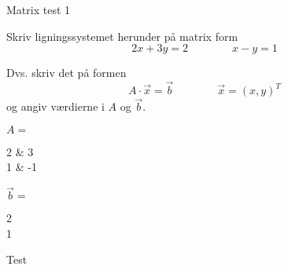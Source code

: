 \documentclass{article}
\begin{document}
\begin{exercise}{Matrix test 1}

Skriv ligningssystemet herunder på matrix form
\[
2x + 3y = 2 \qquad \qquad
x - y = 1
\]

Dvs. skriv det på formen
\[
A \cdot \vec{x} = \vec{b} \qquad \qquad \vec{x} = (x, y)^T
\]
og angiv værdierne i \(A\) og \(\vec{b}\).

\( A = \)
\begin{answermatrix}
2 & 3 \\
1 & -1
\end{answermatrix}


\( \vec{b} = \)
\begin{answermatrix}
2 \\
1
\end{answermatrix}

\hint
Test
\end{exercise}
\end{document}
